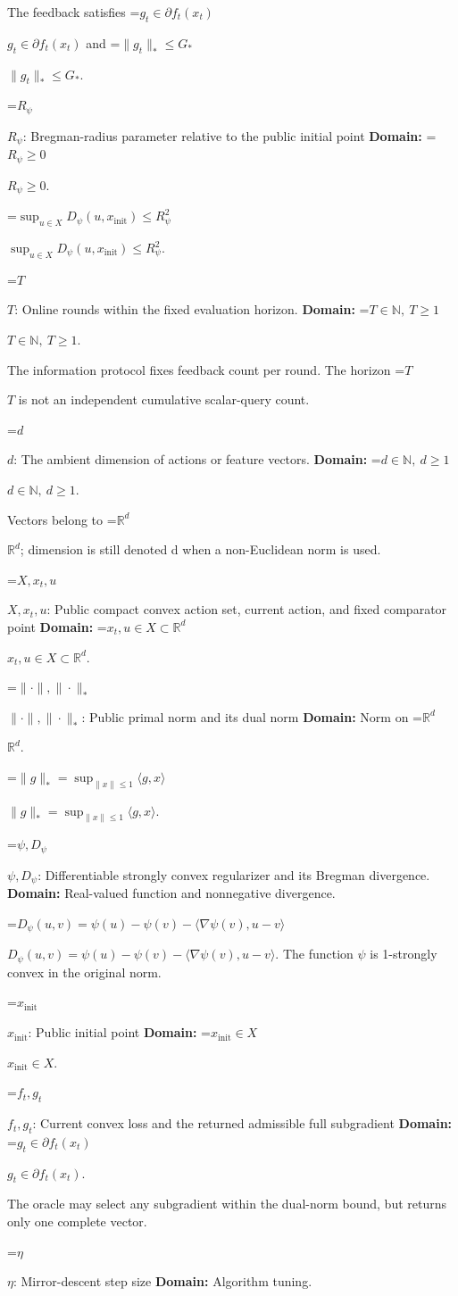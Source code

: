 \documentclass[10pt,a4paper]{article}
\newcommand{\AtlasMath}[1]{\par\begingroup\centering\setbox0=\hbox{$\displaystyle #1$}\ifdim\wd0>1.4\linewidth\typeout{ATLAS WIDE FORMULA: \the\wd0}\fi\ifdim\wd0>\linewidth\resizebox{\linewidth}{!}{\box0}\else\box0\fi\par\endgroup}
\newcommand{\AtlasInlineMath}[1]{\begingroup\setbox0=\hbox{$#1$}\ifdim\wd0>.4\linewidth\endgroup\AtlasMath{#1}\else\endgroup$#1$\fi}
\begin{document}
The feedback satisfies \AtlasInlineMath{g_t\in\partial f_t(x_t)} and \AtlasInlineMath{\|g_t\|_*\le G_*}.

\AtlasInlineMath{R_\psi}: Bregman-radius parameter relative to the public initial point \textbf{Domain:} \AtlasInlineMath{R_\psi\ge0}.

\AtlasInlineMath{\sup_{u\in X}D_\psi(u,x_{\mathrm{init}})\le R_\psi^2}.

\AtlasInlineMath{T}: Online rounds within the fixed evaluation horizon. \textbf{Domain:} \AtlasInlineMath{T\in\mathbb N,\ T\ge1}.

The information protocol fixes feedback count per round. The horizon \AtlasInlineMath{T} is not an independent cumulative scalar-query count.

\AtlasInlineMath{d}: The ambient dimension of actions or feature vectors. \textbf{Domain:} \AtlasInlineMath{d\in\mathbb N,\ d\ge1}.

Vectors belong to \AtlasInlineMath{\mathbb R^d}; dimension is still denoted d when a non-Euclidean norm is used.

\AtlasInlineMath{X,x_t,u}: Public compact convex action set, current action, and fixed comparator point \textbf{Domain:} \AtlasInlineMath{x_t,u\in X\subset\mathbb R^d}.

\AtlasInlineMath{\|\cdot\|,\|\cdot\|_*}: Public primal norm and its dual norm \textbf{Domain:} Norm on \AtlasInlineMath{\mathbb R^d}.

\AtlasInlineMath{\|g\|_* =\sup_{\|x\|\le1}\langle g,x\rangle}.

\AtlasInlineMath{\psi,D_\psi}: Differentiable strongly convex regularizer and its Bregman divergence. \textbf{Domain:} Real-valued function and nonnegative divergence.

\AtlasInlineMath{D_\psi(u,v)=\psi(u)-\psi(v)-\langle\nabla\psi(v),u-v\rangle}. The function $\psi$ is 1-strongly convex in the original norm.

\AtlasInlineMath{x_{\mathrm{init}}}: Public initial point \textbf{Domain:} \AtlasInlineMath{x_{\mathrm{init}}\in X}.

\AtlasInlineMath{f_t,g_t}: Current convex loss and the returned admissible full subgradient \textbf{Domain:} \AtlasInlineMath{g_t\in\partial f_t(x_t)}.

The oracle may select any subgradient within the dual-norm bound, but returns only one complete vector.

\AtlasInlineMath{\eta}: Mirror-descent step size \textbf{Domain:} Algorithm tuning.
\end{document}
